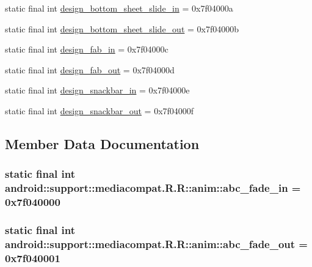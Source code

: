 \begin{CompactItemize}
\item 
static final int \hyperlink{classandroid_1_1support_1_1mediacompat_1_1_r_1_1anim_a2156a59a523c1252377decc2248aaec}{design\_\-bottom\_\-sheet\_\-slide\_\-in} = 0x7f04000a
\item 
static final int \hyperlink{classandroid_1_1support_1_1mediacompat_1_1_r_1_1anim_9b3b14021bc84af0747bee830da01526}{design\_\-bottom\_\-sheet\_\-slide\_\-out} = 0x7f04000b
\item 
static final int \hyperlink{classandroid_1_1support_1_1mediacompat_1_1_r_1_1anim_30811b16e6e81cb38f3ec18e8da9d05c}{design\_\-fab\_\-in} = 0x7f04000c
\item 
static final int \hyperlink{classandroid_1_1support_1_1mediacompat_1_1_r_1_1anim_c1688b40ed0b577918cc20d46f21cbdd}{design\_\-fab\_\-out} = 0x7f04000d
\item 
static final int \hyperlink{classandroid_1_1support_1_1mediacompat_1_1_r_1_1anim_b65d6320e8025e8fadca8b047a98d5f4}{design\_\-snackbar\_\-in} = 0x7f04000e
\item 
static final int \hyperlink{classandroid_1_1support_1_1mediacompat_1_1_r_1_1anim_65ff6dae027852c234db79ad5e802eb9}{design\_\-snackbar\_\-out} = 0x7f04000f
\end{CompactItemize}


\subsection{Member Data Documentation}
\hypertarget{classandroid_1_1support_1_1mediacompat_1_1_r_1_1anim_60295aed0cf7b634614a0db3ba27471a}{
\subsubsection[{abc\_\-fade\_\-in}]{\setlength{\rightskip}{0pt plus 5cm}static final int android::support::mediacompat.R.R::anim::abc\_\-fade\_\-in = 0x7f040000}}
\label{classandroid_1_1support_1_1mediacompat_1_1_r_1_1anim_60295aed0cf7b634614a0db3ba27471a}


\hypertarget{classandroid_1_1support_1_1mediacompat_1_1_r_1_1anim_715eb554a88e90f5a9443b482771a0b6}{
\subsubsection[{abc\_\-fade\_\-out}]{\setlength{\rightskip}{0pt plus 5cm}static final int android::support::mediacompat.R.R::anim::abc\_\-fade\_\-out = 0x7f040001}}
\label{classandroid_1_1support_1_1mediacompat_1_1_r_1_1anim_715eb554a88e90f5a9443b482771a0b6}


